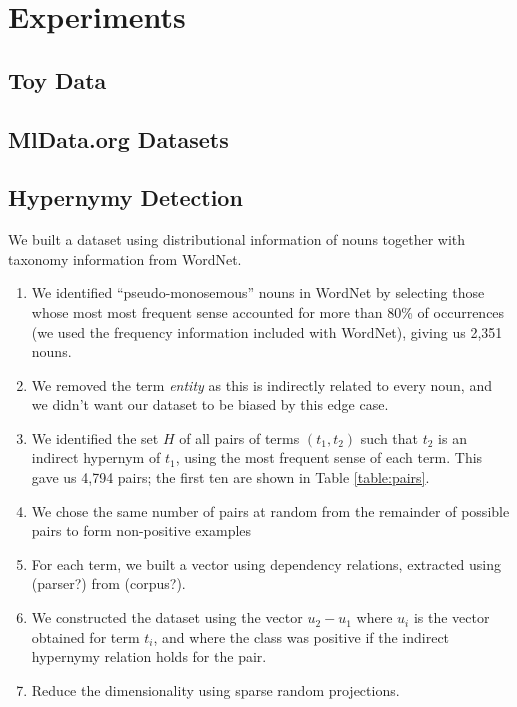 \section{Experiments}

\subsection{Toy Data}

\subsection{MlData.org Datasets}

\subsection{Hypernymy Detection}

We built a dataset using distributional information of nouns together
with taxonomy information from WordNet.
\begin{enumerate}
\item We identified ``pseudo-monosemous'' nouns in WordNet by
  selecting those whose most most frequent sense accounted for more
  than 80\% of occurrences (we used the frequency information included
  with WordNet), giving us 2,351 nouns.
\item We removed the term \emph{entity} as this is indirectly related
  to every noun, and we didn't want our dataset to be biased by this
  edge case.
\item We identified the set $H$ of all pairs of terms $(t_1, t_2)$
  such that $t_2$ is an indirect hypernym of $t_1$, using the most
  frequent sense of each term. This gave us 4,794 pairs; the first ten
  are shown in Table \ref{table:pairs}.
\item We chose the same number of pairs at random from the remainder
  of possible pairs to form non-positive examples
\item For each term, we built a vector using dependency relations,
  extracted using (parser?) from (corpus?).
\item We constructed the dataset using the vector $u_2 - u_1$ where
  $u_i$ is the vector obtained for term $t_i$, and where the class was
  positive if the indirect hypernymy relation holds for the pair.
\item Reduce the dimensionality using sparse random projections.
\end{enumerate}

